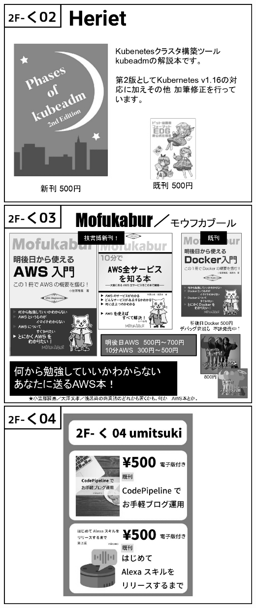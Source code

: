 \begin{center}
\includegraphics[width=0.9\linewidth]{images/circle-appeals/2F-く02.jpg}
\includegraphics[width=0.9\linewidth]{images/circle-appeals/2F-く03.jpg}
\includegraphics[width=0.9\linewidth]{images/circle-appeals/2F-く04.jpg}

\end{center}

